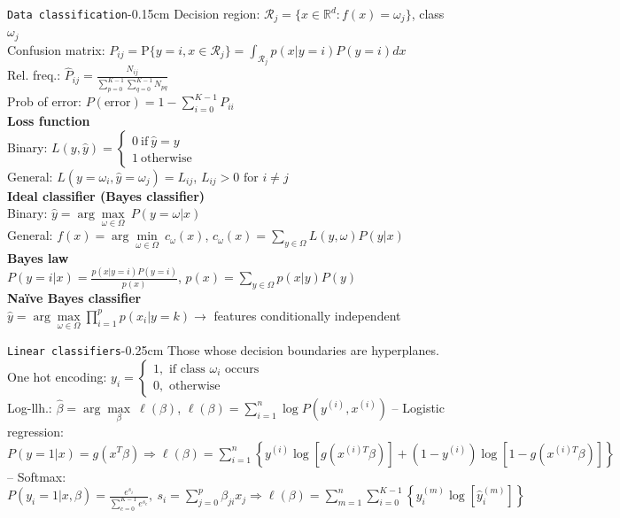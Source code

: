 \documentclass[10pt,3col]{cheatsheet}
\begin{document}
\begin{multicols}{3}
\begin{cheatsheetbox}{\texttt{Data classification}}{-0.15cm}
    Decision region: $\mathcal{R}_j = \{x \in \mathbb{R}^d: f(x) = \omega_j\}$, class $\omega_j$\\
    Confusion matrix: $P_{ij} = \mathrm{P}\{y = i, x \in \mathcal{R}_j\} = \int_{\mathcal{R}_j} p(x|y=i)P(y = i)dx$\\
    Rel. freq.: $\hat{P}_{ij} = \frac{N_{ij}}{\sum_{p=0}^{K-1} \sum_{q=0}^{K-1} N_{pq}}$\\
    Prob of error: $P(\mathrm{error}) = 1 - \sum_{i=0}^{K-1}P_{ii}$\\
    \textbf{Loss function}\\
    Binary: $L(y, \hat{y}) = \begin{cases} 0 \ \mathrm{if} \ \hat{y} = y\\ 1 \ \mathrm{otherwise}\end{cases}$\\
    General: $L(y = \omega_i, \hat{y} = \omega_j) = L_{ij}$, $L_{ij} > 0 \text{ for } i \neq j$\\
    \textbf{Ideal classifier (Bayes classifier)}\\
    Binary: $\hat{y} = \arg\underset{\omega \in \Omega}{\max} \ P(y = \omega | x)$\\
    General: {\footnotesize $f(x) =  \arg\underset{\omega \in \Omega}{\min} \ c_\omega(x)$, $c_\omega(x) = \sum_{y \in \Omega} L(y, \omega)P(y|x)$}\\
    \textbf{Bayes law}\\
    $P(y=i|x) = \frac{p(x|y=i)P(y=i)}{p(x)}$, $p(x) = \sum_{y\in \Omega}p(x|y)P(y)$\\
    \textbf{Na\"ive Bayes classifier}\\
    $\hat{y} =  \arg\underset{\omega \in \Omega}{\max} \prod_{i=1}^p p(x_i | y = k) \rightarrow$ features conditionally independent
\end{cheatsheetbox}

\begin{cheatsheetbox}{\texttt{Linear classifiers}}{-0.25cm}
    Those whose decision boundaries are hyperplanes.\\
    One hot encoding: $y_i = \begin{cases} 1, \text{ if class $\omega_i$ occurs}\\ 0, \text{ otherwise}\end{cases}$\\
    Log-llh.: $\hat{\beta} = \arg\underset{\beta}{\max} \ \ell(\beta)$, $\ell(\beta) = \sum_{i=1}^n \log P(y^{(i)}, x^{(i)})$
    -- Logistic regression: $P(y = 1| x) = g(x^T\beta) \Rightarrow \ell(\beta) = \sum_{i = 1}^n \left\{y^{(i)}\log[g(x^{(i)T}\beta)] + (1- y^{(i)})\log[1 - g(x^{(i)T}\beta)]\right\}$\\
    -- Softmax: $P(y_i = 1| x, \beta) = \frac{e^{s_i}}{\sum_{c=0}^{K-1}e^{s_c}}, \ s_i = \sum_{j = 0}^p \beta_{ji}x_j \Rightarrow \ell(\beta) = \sum_{m = 1}^n \sum_{i = 0}^{K-1}\left\{y_i^{(m)}\log[\hat{y}_i^{(m)}]\right\}$
\end{cheatsheetbox}


\end{multicols}
\end{document}
